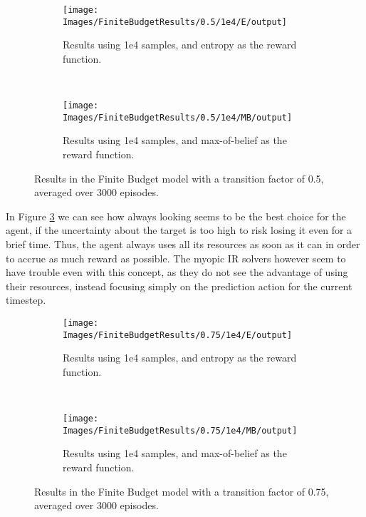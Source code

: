 \begin{figure}[ht!]
        \centering
        \begin{subfigure}[t]{0.45\textwidth}
                \texttt{[image: Images/FiniteBudgetResults/0.5/1e4/E/output]}
                \caption{Results using 1e4 samples, and entropy as the reward function.}
                \label{fig:fb4e5}
        \end{subfigure}%
        ~ %
        \begin{subfigure}[t]{0.45\textwidth}
                \texttt{[image: Images/FiniteBudgetResults/0.5/1e4/MB/output]}
                \caption{Results using 1e4 samples, and max-of-belief as the reward function.}
                \label{fig:fb5e5}
        \end{subfigure}
        \caption{Results in the Finite Budget model with a transition factor of 0.5, averaged over 3000 episodes.}
        \label{ref:fbentropyfig5}
\end{figure}

In Figure \ref{ref:fbentropyfig5} we can see how always looking seems to be the best choice for the
agent, if the uncertainty about the target is too high to risk losing it even for a brief time.
Thus, the agent always uses all its resources as soon as it can in order to accrue as much reward as
possible. The myopic IR solvers however seem to have trouble even with this concept, as they do not
see the advantage of using their resources, instead focusing simply on the prediction action for the
current timestep.

\begin{figure}[ht!]
        \centering
        \begin{subfigure}[t]{0.45\textwidth}
                \texttt{[image: Images/FiniteBudgetResults/0.75/1e4/E/output]}
                \caption{Results using 1e4 samples, and entropy as the reward function.}
                \label{fig:fb4e75}
        \end{subfigure}%
        ~ %
        \begin{subfigure}[t]{0.45\textwidth}
                \texttt{[image: Images/FiniteBudgetResults/0.75/1e4/MB/output]}
                \caption{Results using 1e4 samples, and max-of-belief as the reward function.}
                \label{fig:fb5e75}
        \end{subfigure}
        \caption{Results in the Finite Budget model with a transition factor of 0.75, averaged over 3000 episodes.}
        \label{ref:fbentropyfig75}
\end{figure}


